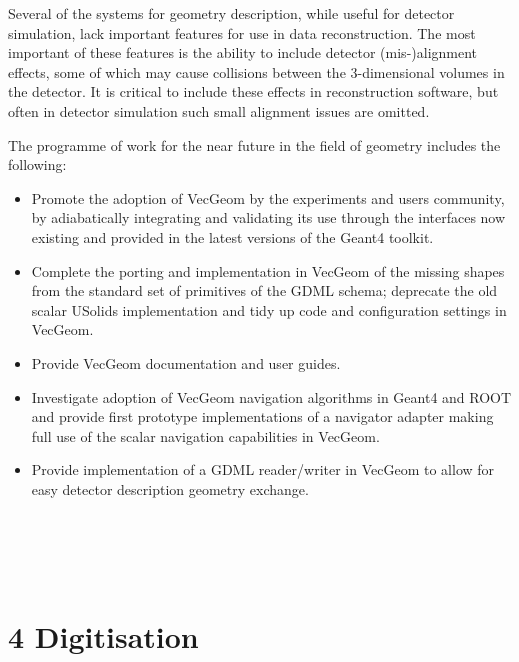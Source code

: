 \documentclass[12pt,a4paper]{article}
\begin{document}
Several of the systems for geometry description, while useful for
detector simulation, lack important features for use in data
reconstruction. The most important of these features is the ability to
include detector (mis-)alignment effects, some of which may cause
collisions between the 3-dimensional volumes in the detector. It is
critical to include these effects in reconstruction software, but often
in detector simulation such small alignment issues are omitted.

The programme of work for the near future in the field of geometry
includes the following:

\begin{itemize}
\item
  Promote the adoption of VecGeom by the experiments and users
  community, by adiabatically integrating and validating its use through
  the interfaces now existing and provided in the latest versions of the
  Geant4 toolkit.
\item
  Complete the porting and implementation in VecGeom of the missing
  shapes from the standard set of primitives of the GDML schema;
  deprecate the old scalar USolids implementation and tidy up code and
  configuration settings in VecGeom.
\item
  Provide VecGeom documentation and user guides.
\item
  Investigate adoption of VecGeom navigation algorithms in Geant4 and
  ROOT and provide first prototype implementations of a navigator
  adapter making full use of the scalar navigation capabilities in
  VecGeom.
\item
  Provide implementation of a GDML reader/writer in VecGeom to allow for
  easy detector description geometry exchange.
\end{itemize}

\hypertarget{section-1}{%
\section{\texorpdfstring{\\
}{ }}\label{section-1}}

\hypertarget{digitisation}{%
\section{4 Digitisation}\label{digitisation}}
\end{document}
